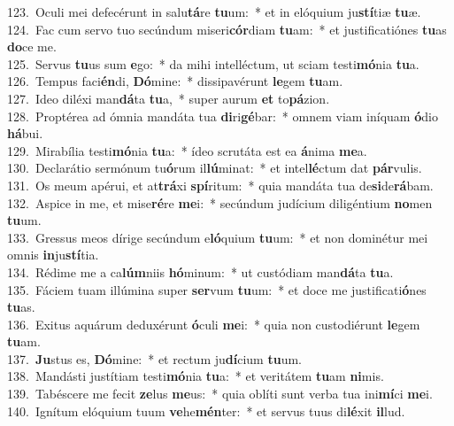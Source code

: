 {123.~}Oculi mei defecérunt in salu\textbf{tá}re \textbf{tu}um:~* et in elóquium ju\textbf{stí}tiæ \textbf{tu}æ.\\
{124.~}Fac cum servo tuo secúndum miseri\textbf{cór}diam \textbf{tu}am:~* et justificatiónes \textbf{tu}as \textbf{do}ce me.\\
{125.~}Servus \textbf{tu}us sum \textbf{e}go:~* da mihi intelléctum, ut sciam testi\textbf{mó}nia \textbf{tu}a.\\
{126.~}Tempus faci\textbf{én}di, \textbf{Dó}mine:~* dissipavérunt \textbf{le}gem \textbf{tu}am.\\
{127.~}Ideo diléxi man\textbf{dá}ta \textbf{tu}a,~* super aurum \textbf{et} to\textbf{pá}zion.\\
{128.~}Proptérea ad ómnia mandáta tua \textbf{di}ri\textbf{gé}bar:~* omnem viam iníquam \textbf{ó}dio \textbf{há}bui.\\
{129.~}Mirabília testi\textbf{mó}nia \textbf{tu}a:~* ídeo scrutáta est ea \textbf{á}nima \textbf{me}a.\\
{130.~}Declarátio sermónum tu\textbf{ó}rum il\textbf{lú}minat:~* et intel\textbf{lé}ctum dat \textbf{pár}vulis.\\
{131.~}Os meum apérui, et at\textbf{trá}xi \textbf{spí}ritum:~* quia mandáta tua de\textbf{si}de\textbf{rá}bam.\\
{132.~}Aspice in me, et mise\textbf{ré}re \textbf{me}i:~* secúndum judícium diligéntium \textbf{no}men \textbf{tu}um.\\
{133.~}Gressus meos dírige secúndum e\textbf{ló}quium \textbf{tu}um:~* et non dominétur mei omnis \textbf{in}ju\textbf{stí}tia.\\
{134.~}Rédime me a ca\textbf{lúm}niis \textbf{hó}minum:~* ut custódiam man\textbf{dá}ta \textbf{tu}a.\\
{135.~}Fáciem tuam illúmina super \textbf{ser}vum \textbf{tu}um:~* et doce me justificati\textbf{ó}nes \textbf{tu}as.\\
{136.~}Exitus aquárum deduxérunt \textbf{ó}culi \textbf{me}i:~* quia non custodiérunt \textbf{le}gem \textbf{tu}am.\\
{137.~}\textbf{Ju}stus es, \textbf{Dó}mine:~* et rectum ju\textbf{dí}cium \textbf{tu}um.\\
{138.~}Mandásti justítiam testi\textbf{mó}nia \textbf{tu}a:~* et veritátem \textbf{tu}am \textbf{ni}mis.\\
{139.~}Tabéscere me fecit \textbf{ze}lus \textbf{me}us:~* quia oblíti sunt verba tua ini\textbf{mí}ci \textbf{me}i.\\
{140.~}Ignítum elóquium tuum \textbf{ve}he\textbf{mén}ter:~* et servus tuus di\textbf{lé}xit \textbf{il}lud.\\
